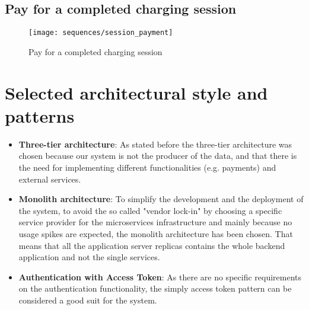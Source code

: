 \subsection{Pay for a completed charging session}
\begin{figure}[h]
\texttt{[image: sequences/session\_payment]}
\caption{Pay for a completed charging session}
\end{figure}
\clearpage

\section{Selected architectural style and patterns}
\begin{itemize}
	\item \textbf{Three-tier architecture}: As stated before the three-tier architecture was chosen because our system is not the producer of the data, and that there is the need for implementing different functionalities (e.g. payments) and external services.
	\item \textbf{Monolith architecture}: To simplify the development and the deployment of the system, to avoid the so called "vendor lock-in" by choosing a specific service provider for the microservices infrastructure and mainly because no usage spikes are expected, the monolith architecture has been chosen. That means that all the application server replicas contains the whole backend application and not the single services.
	\item \textbf{Authentication with Access Token}: As there are no specific requirements on the authentication functionality, the simply access token pattern can be considered a good suit for the system. 
\end{itemize}











